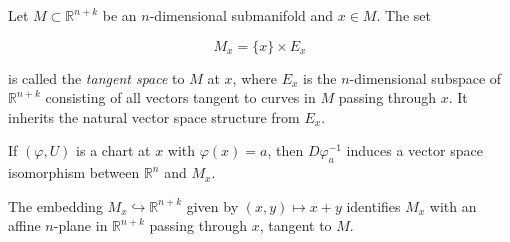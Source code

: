 Let $M \subset \mathbb{R}^{n+k}$ be an $n$-dimensional submanifold and $x \in M$. The set

$$M_x = \{x\} \times E_x$$

is called the \textit{tangent space} to $M$ at $x$, where $E_x$ is the $n$-dimensional subspace of $\mathbb{R}^{n+k}$ consisting of all vectors tangent to curves in $M$ passing through $x$. It inherits the natural vector space structure from $E_x$.

If $(\varphi, U)$ is a chart at $x$ with $\varphi(x) = a$, then $D\varphi_a^{-1}$ induces a vector space isomorphism between $\mathbb{R}^n$ and $M_x$.

The embedding $M_x \hookrightarrow \mathbb{R}^{n+k}$ given by $(x, y) \mapsto x + y$ identifies $M_x$ with an affine $n$-plane in $\mathbb{R}^{n+k}$ passing through $x$, tangent to $M$.

